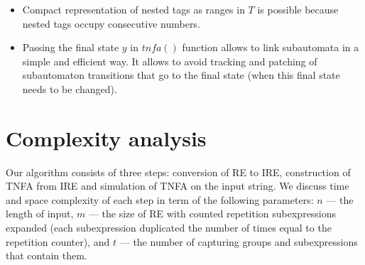\documentclass[AMA,STIX1COL]{WileyNJD-v2}
\begin{document}
\begin{itemize}[itemsep=0.5em, topsep=0.5em]
    \item Compact representation of nested tags as ranges in $T$
        is possible because nested tags occupy consecutive numbers.

    \item Passing the final state $y$ in $tn\!f\!a()$ function allows to link subautomata in a simple and efficient way.
        It allows to avoid tracking and patching of subautomaton transitions that go to the final state
        (when this final state needs to be changed).
\end{itemize}


\section{Complexity analysis}\label{section_complexity}

Our algorithm consists of three steps: conversion of RE to IRE,
construction of TNFA from IRE
and simulation of TNFA on the input string.
We discuss time and space complexity of each step
in term of the following parameters:
$n$ --- the length of input,
$m$ --- the size of RE with counted repetition subexpressions expanded
(each subexpression duplicated the number of times equal to the repetition counter),
and $t$ --- the number of capturing groups and subexpressions that contain them.
\\
\end{document}
